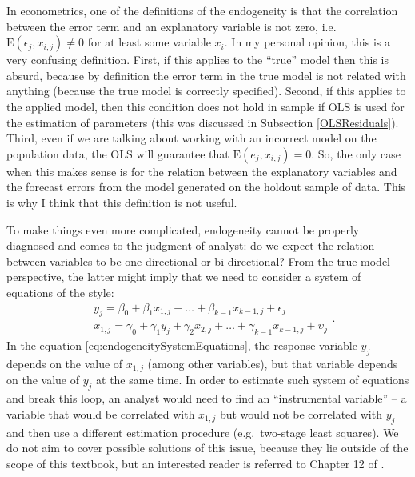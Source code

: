 \documentclass[
]{book}
\theoremstyle{definition}
\theoremstyle{definition}
\theoremstyle{definition}
\theoremstyle{definition}
\theoremstyle{remark}
\begin{document}
In econometrics, one of the definitions of the endogeneity is that the correlation between the error term and an explanatory variable is not zero, i.e.~\(\mathrm{E}(\epsilon_j, x_{i,j}) \neq 0\) for at least some variable \(x_i\). In my personal opinion, this is a very confusing definition. First, if this applies to the ``true'' model then this is absurd, because by definition the error term in the true model is not related with anything (because the true model is correctly specified). Second, if this applies to the applied model, then this condition does not hold in sample if OLS is used for the estimation of parameters (this was discussed in Subsection \ref{OLSResiduals}). Third, even if we are talking about working with an incorrect model on the population data, the OLS will guarantee that \(\mathrm{E}(e_j, x_{i,j}) = 0\). So, the only case when this makes sense is for the relation between the explanatory variables and the forecast errors from the model generated on the holdout sample of data. This is why I think that this definition is not useful.

To make things even more complicated, endogeneity cannot be properly diagnosed and comes to the judgment of analyst: do we expect the relation between variables to be one directional or bi-directional? From the true model perspective, the latter might imply that we need to consider a system of equations of the style:
\begin{equation}
    \begin{aligned}
        & y_j = \beta_0 + \beta_1 x_{1,j} + \dots + \beta_{k-1} x_{k-1,j} + \epsilon_j \\
        & x_{1,j} = \gamma_0 + \gamma_1 y_{j} + \gamma_{2} x_{2,j} + \dots + \gamma_{k-1} x_{k-1,j} + \upsilon_j
    \end{aligned} .
  \label{eq:endogeneitySystemEquations}
\end{equation}
In the equation \eqref{eq:endogeneitySystemEquations}, the response variable \(y_j\) depends on the value of \(x_{1,j}\) (among other variables), but that variable depends on the value of \(y_j\) at the same time. In order to estimate such system of equations and break this loop, an analyst would need to find an ``instrumental variable'' -- a variable that would be correlated with \(x_{1,j}\) but would not be correlated with \(y_j\) and then use a different estimation procedure (e.g.~two-stage least squares). We do not aim to cover possible solutions of this issue, because they lie outside of the scope of this textbook, but an interested reader is referred to Chapter 12 of \citet{Hanck2020}.
\end{document}
